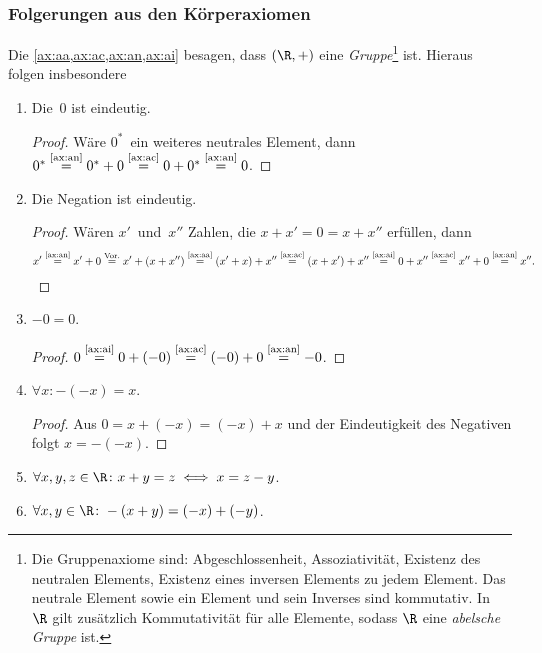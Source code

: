 \documentclass[a4paper]{article}
\begin{document}
\subsubsection{Folgerungen aus den Körperaxiomen}

Die \cref{ax:aa,ax:ac,ax:an,ax:ai} besagen, dass $(\R,+)$ eine \emph{Gruppe}\footnote{Die Gruppenaxiome sind: Abgeschlossenheit, Assoziativität, Existenz des neutralen Elements, Existenz eines inversen Elements zu jedem Element. Das neutrale Element sowie ein Element und sein Inverses sind kommutativ. In~$\R$ gilt zusätzlich Kommutativität für alle Elemente, sodass $\R$ eine \emph{abelsche Gruppe} ist.} ist. Hieraus folgen insbesondere
\begin{enumerate}[label=\textnormal{(\alph*)}, leftmargin=*, widest=(m), series=conclusions]
    \item Die~$0$ ist eindeutig.
          \begin{proof}
              Wäre $0^*$~ein weiteres neutrales Element, dann $0^* \overset{\text{\ref{ax:an}}}{=} 0^* + 0 \overset{\text{\ref{ax:ac}}}{=} 0 + 0^* \overset{\text{\ref{ax:an}}}{=} 0$.
          \end{proof}
    \item Die Negation ist eindeutig.
          \begin{proof}
              Wären $x'$~und~$x''$ Zahlen, die $x + x' = 0 = x + x''$ erfüllen, dann
              \begin{equation*}
                  x' \overset{\text{\ref{ax:an}}}{=} x' + 0 \overset{\text{Vor.}}{=} x' + (x + x'') \overset{\text{\ref{ax:aa}}}{=} (x' + x) + x'' \overset{\text{\ref{ax:ac}}}{=} (x + x') + x'' \overset{\text{\ref{ax:ai}}}{=} 0 + x'' \overset{\text{\ref{ax:ac}}}{=} x'' + 0 \overset{\text{\ref{ax:an}}}{=} x''.\qedhere
              \end{equation*}
          \end{proof}
    \item $-0 = 0$.
          \begin{proof}
              $0 \overset{\text{\ref{ax:ai}}}{=} 0 + (-0) \overset{\text{\ref{ax:ac}}}{=} (-0) + 0 \overset{\text{\ref{ax:an}}}{=} -0$.
          \end{proof}
    \item $\forall x\colon - (-x) = x$.
          \begin{proof}
              Aus $0 = x + (-x) = (-x) + x$ und der Eindeutigkeit des Negativen folgt $x = - (-x)$.
          \end{proof}
    \item $\forall x, y, z \in \R\colon x + y = z \iff x = z - y$.\label{ax:addequiv}
    \item $\forall x, y \in \R\colon -(x + y) = (-x) + (-y)$.
\end{enumerate}
\end{document}
